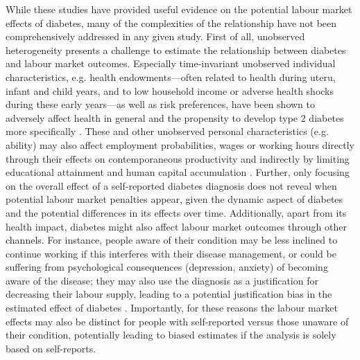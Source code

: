 While these studies have provided useful evidence on the potential labour market effects of diabetes, many of the complexities of the relationship have not been comprehensively addressed in any given study. First of all, unobserved heterogeneity presents a challenge to estimate the relationship between diabetes and labour market outcomes. Especially time-invariant unobserved individual characteristics, e.g. health endowments---often related to health during uteru, infant and child years, and to low household income or adverse health shocks during these early years---as well as risk preferences, have been shown to adversely affect health in general and the propensity to develop type 2 diabetes more specifically \parencite{VanEwijk2011,Sotomayor2013,Li2010b}. These and other unobserved personal characteristics (e.g. ability) may also affect employment probabilities, wages or working hours directly through their effects on contemporaneous productivity \parencite{Currie2013} and indirectly by limiting educational attainment and human capital accumulation \parencite{Ayyagari2011a}. Further, only focusing on the overall effect of a self-reported diabetes diagnosis does not reveal when potential labour market penalties appear, given the dynamic aspect of diabetes and the potential differences in its effects over time. Additionally, apart from its health impact, diabetes might also affect labour market outcomes through other channels. For instance, people aware of their condition may be less inclined to continue working if this interferes with their disease management, or could be suffering from psychological consequences (depression, anxiety) of becoming aware of the disease; they may also use the diagnosis as a justification for decreasing their labour supply, leading to a potential justification bias in the estimated effect of diabetes \parencite{Kapteyn2009}. Importantly, for these reasons the labour market effects may also be distinct for people with self-reported versus those unaware of their condition, potentially leading to biased estimates if the analysis is solely based on self-reports.

